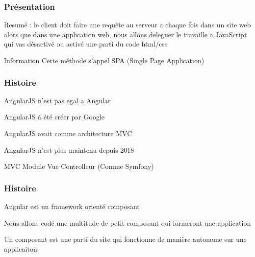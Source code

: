 \documentclass[10pt]{beamer}
\begin{document}
	\begin{frame}
		\frametitle{Présentation}

		Resumé :
		\newline \newline
		le client doit faire une requête au serveur a chaque fois dans un site web \newline \newline
		alors que dans une application web, nous allons deleguer le travaille a JavaScript qui vas désactivé ou activé une parti du code html/css
		\newline \newline
		\begin{block}{Information}
			Cette méthode s'appel SPA (Single Page Application)
		\end{block}
	\end{frame}

	\begin{frame}
		\frametitle{Histoire}

		AngularJS n'est pas egal a Angular \newline \newline

		AngularJS à été créer par Google \newline \newline

		AngularJS avait comme architecture MVC \newline \newline

		AngularJS n'est plus maintenu depuis 2018 \newline \newline

		\begin{block}{MVC}
			Module Vue Controlleur (Comme Symfony)
		\end{block}

	\end{frame}

	\begin{frame}
		\frametitle{Histoire}

		Angular est un framework orienté composant \newline \newline

		Nous allons codé une multitude de petit composant qui formeront une application \newline \newline

		Un composant est une parti du site qui fonctionne de manière autonome sur une applicaiton

	\end{frame}
\end{document}
